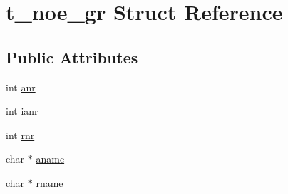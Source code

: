 \hypertarget{structt__noe__gr}{\section{t\-\_\-noe\-\_\-gr \-Struct \-Reference}
\label{structt__noe__gr}
}
\subsection*{\-Public \-Attributes}
\begin{DoxyCompactItemize}
\item 
int \hyperlink{structt__noe__gr_adda451801c5808e33d28f67a400458c1}{anr}
\item 
int \hyperlink{structt__noe__gr_a820b67e8cfe73cfc3e11c7e4fcbb8d4e}{ianr}
\item 
int \hyperlink{structt__noe__gr_a7e8c7115e0ee2eaebb073a94178ae5ff}{rnr}
\item 
char $\ast$ \hyperlink{structt__noe__gr_a43d94d1f0e6ecddb06841292488e3dda}{aname}
\item 
char $\ast$ \hyperlink{structt__noe__gr_a7416ac3db2a9dc62e9e036da0a53198d}{rname}
\end{DoxyCompactItemize}


